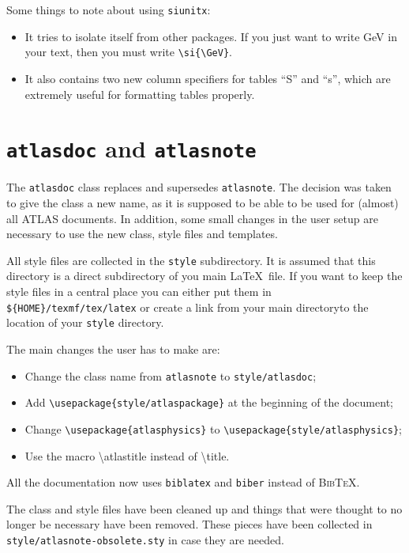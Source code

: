 \documentclass{style/atlasdoc}
\newcommand{\BibTeX}{\textsc{Bib\TeX}}
\newcommand{\Macro}[1]{\textbackslash #1\xspace}
\begin{document}
Some things to note about using \texttt{siunitx}:
\begin{itemize}
\item It tries to isolate itself from other packages.
	If you just want to write \si{\GeV} in your text,
	then you must write \verb|\si{\GeV}|.
\item It also contains two new column specifiers for tables ``S'' and ``s'',
	which are extremely useful for formatting tables properly.
\end{itemize}


\section{\texttt{atlasdoc} and \texttt{atlasnote}}
\label{sec:old}

The \texttt{atlasdoc} class replaces and supersedes \texttt{atlasnote}.
The decision was taken to give the class a new name, as it is supposed to be
able to be used for (almost) all ATLAS documents.
In addition, some small changes in the user setup are necessary to use the new
class, style files and templates.

All style files are collected in the \texttt{style} subdirectory.
It is assumed that this directory is a direct subdirectory of you main \LaTeX\ file.
If you want to keep the style files in a central place you can either put them in
\verb|${HOME}/texmf/tex/latex| or create a link from your main directoryto the location of
your \texttt{style} directory.

The main changes the user has to make are:
\begin{itemize}
\item Change the class name from \texttt{atlasnote} to \texttt{style/atlasdoc};
\item Add \verb|\usepackage{style/atlaspackage}| at the beginning of the document;
\item Change \verb|\usepackage{atlasphysics}| to \verb|\usepackage{style/atlasphysics}|; 
\item Use the macro \Macro{atlastitle} instead of \Macro{title}.
\end{itemize}

All the documentation now uses \texttt{biblatex} and \texttt{biber} instead of \BibTeX.

The class and style files have been cleaned up and things 
that were thought to no longer be necessary have been removed.
These pieces have been collected in \texttt{style/atlasnote-obsolete.sty} in case they are needed.
\end{document}
